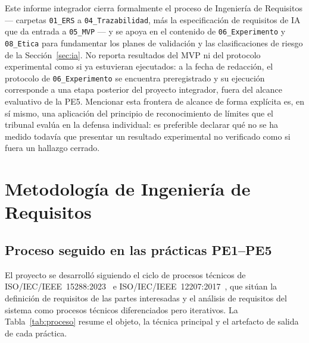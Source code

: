 \documentclass[11pt,a4paper]{article}
\newcommand{\id}[1]{\texttt{#1}}
\begin{document}
Este informe integrador cierra formalmente el proceso de Ingeniería de Requisitos --- carpetas
\id{01\_ERS} a \id{04\_Trazabilidad}, más la especificación de requisitos de IA que da entrada a
\id{05\_MVP} --- y se apoya en el contenido de \id{06\_Experimento} y \id{08\_Etica} para
fundamentar los planes de validación y las clasificaciones de riesgo de la Sección~\ref{sec:ia}. No
reporta resultados del MVP ni del protocolo experimental como si ya estuvieran ejecutados: a la
fecha de redacción, el protocolo de \id{06\_Experimento} se encuentra preregistrado y su ejecución
corresponde a una etapa posterior del proyecto integrador, fuera del alcance evaluativo de la PE5.
Mencionar esta frontera de alcance de forma explícita es, en sí mismo, una aplicación del principio
de reconocimiento de límites que el tribunal evalúa en la defensa individual: es preferible declarar
qué no se ha medido todavía que presentar un resultado experimental no verificado como si fuera un
hallazgo cerrado.

\section{Metodología de Ingeniería de Requisitos}

\subsection{Proceso seguido en las prácticas PE1--PE5}

El proyecto se desarrolló siguiendo el ciclo de procesos técnicos de
ISO/IEC/IEEE~15288:2023~\cite{iso15288} e ISO/IEC/IEEE~12207:2017~\cite{iso12207}, que sitúan la
definición de requisitos de las partes interesadas y el análisis de requisitos del sistema como
procesos técnicos diferenciados pero iterativos. La Tabla~\ref{tab:proceso} resume el objeto, la
técnica principal y el artefacto de salida de cada práctica.
\end{document}
